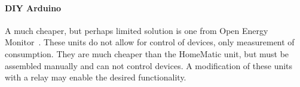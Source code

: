 \paragraph{DIY Arduino}
A much cheaper, but perhaps limited solution is one from Open Energy Monitor~\cite{oemmodule}. These units do not allow for control of devices, only measurement of consumption. They are much cheaper than the HomeMatic unit, but must be assembled manually and can not control devices. A modification of these units with a relay may enable the desired functionality.